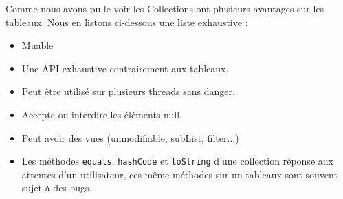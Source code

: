 Comme nous avons pu le voir les Collections ont plusieurs avantages sur les tableaux. Nous en listons ci-dessous une liste exhaustive :
\begin{itemize}
  \item Muable
  \item Une API exhaustive contrairement aux tableaux.
  \item Peut être utilisé sur plusieurs threads sans danger.
  \item Accepte ou interdire les éléments null.
  \item Peut avoir des vues (unmodifiable, subList, filter...)
  \item Les méthodes \texttt{equals}, \texttt{hashCode} et \texttt{toString} d'une collection réponse aux attentes d'un utilisateur, ces même méthodes sur un tableaux sont souvent sujet à des bugs.
\end{itemize}
